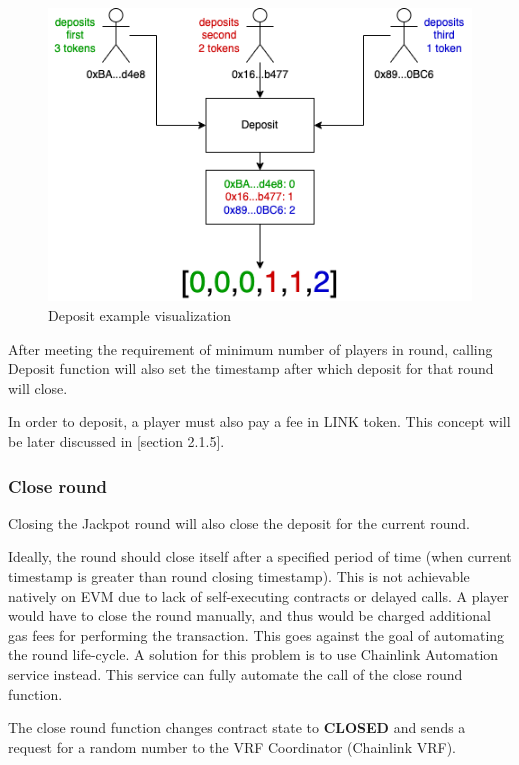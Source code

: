 \documentclass[12pt]{article}
\begin{document}
\begin{figure}[!ht]
    \centering
    \includegraphics[scale=0.6]{images/deposit.png} 
    \caption{Deposit example visualization}
    \label{fig:b1}
\end{figure}
\FloatBarrier

After meeting the requirement of minimum number of players in round, calling Deposit function will also set the timestamp after which deposit for that round will close.

In order to deposit, a player must also pay a fee in LINK token. This concept will be later discussed in [section 2.1.5].

\subsubsection{Close round}

Closing the Jackpot round will also close the deposit for the current round.

Ideally, the round should close itself after a specified period of time (when current timestamp is greater than round closing timestamp). This is not achievable natively on EVM due to lack of self-executing contracts or delayed calls. A player would have to close the round manually, and thus would be charged additional gas fees for performing the transaction. This goes against the goal of automating the round life-cycle.
A solution for this problem is to use Chainlink Automation service instead. This service can fully automate the call of the close round function.

\hfill

The close round function changes contract state to \textbf{CLOSED} and sends a request for a random number to the VRF Coordinator (Chainlink VRF).
\end{document}
